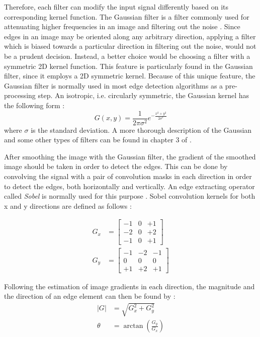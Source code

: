 Therefore, each filter can modify the input signal differently based on its corresponding kernel function.
The Gaussian filter is a filter commonly used for attenuating higher frequencies in an image and filtering out the noise \cite{wells86}. 
Since edges in an image may be oriented along any arbitrary direction, 
applying a filter which is biased towards a particular direction in filtering out the noise, would not be a prudent decision. Instead, a better choice would be choosing a filter 
with a symmetric 2D kernel function. 
This feature is particularly found in the Gaussian filter, since it employs a 2D symmetric kernel. Because of this unique feature, 
the Gaussian filter is normally used in most edge detection algorithms as a pre-processing step.
An isotropic, i.e. circularly symmetric, the Gaussian kernel has the following form \cite{sze11}:
\begin{equation}
G(x,y)=\frac{1}{2\pi \sigma ^{2}} e^{-\frac{x^{2}+y^{2}}{2\sigma^{2}}}
\end{equation}
where $\sigma$ is the standard deviation. 
A more thorough description of the Gaussian and some other types of filters can be found in chapter 3 of \cite{sze11}.

After smoothing the image with the Gaussian filter, the gradient of the smoothed image should be taken in order to detect the edges. This can be done by convolving 
the signal with a pair of convolution masks in each direction in order to detect the edges, both horizontally and vertically. An edge extracting operator called {\it Sobel} is normally used
for this purpose \cite{sze11}. 
Sobel convolution kernels for both x and y directions are defined as follows \cite{sze11}:

\begin{align}
G_{x} &= \begin{bmatrix}
-1 & 0 & +1 \\ 
-2 & 0 & +2 \\ 
-1 & 0 & +1
\end{bmatrix} \\
G_{y} &= \begin{bmatrix}
-1 & -2 & -1 \\ 
0 & 0 & 0 \\ 
+1 & +2 & +1
\end{bmatrix}
\end{align}

Following the estimation of image gradients in each direction, the magnitude and the direction of an edge element can then be found by \cite{sze11}:
\begin{align}
\left | G \right | &= \sqrt{G_{x}^{2} + G_{y}^{2}} \\
\theta &= \arctan (\frac{G_{y}}{G_{x}})
\end{align}

